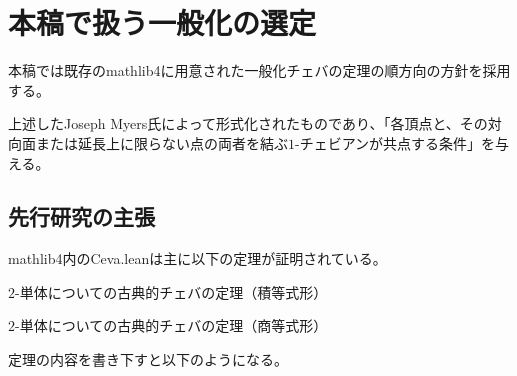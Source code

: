 \documentclass[a4paper,12pt]{bxjsbook}
\newlength{\customindent}
\newenvironment{body}{
  \par
  \begingroup
  \setlength{\leftskip}{\customindent}
  \setlength{\rightskip}{0pt}
  \setlength{\parindent}{1em}
  \setlength{\displayindent}{\customindent}
  \setlength{\displaywidth}{\dimexpr\linewidth-\customindent\relax}
}{
  \par
  \endgroup
}
\theoremstyle{theorem}
\begin{document}
    \section{本稿で扱う一般化の選定}
    \begin{body}
        \indent 本稿では既存のmathlib4に用意された一般化チェバの定理の順方向の方針を採用する。

        \indent 上述したJoseph Myers氏によって形式化されたものであり、「各頂点と、その対向面または延長上に限らない点の両者を結ぶ$1$-チェビアンが共点する条件」を与える。
    \end{body}

    \subsection{先行研究の主張}

    \begin{body}
        \indent mathlib4内のCeva.leanは主に以下の定理が証明されている。
        
        \begin{bodyitemize}
            \item 
            \item 
            \item 
            \item $2$-単体についての古典的チェバの定理（積等式形）
            \item $2$-単体についての古典的チェバの定理（商等式形）
        \end{bodyitemize}
            \indent 

            定理の内容を書き下すと以下のようになる。
    \end{body}
\end{document}
